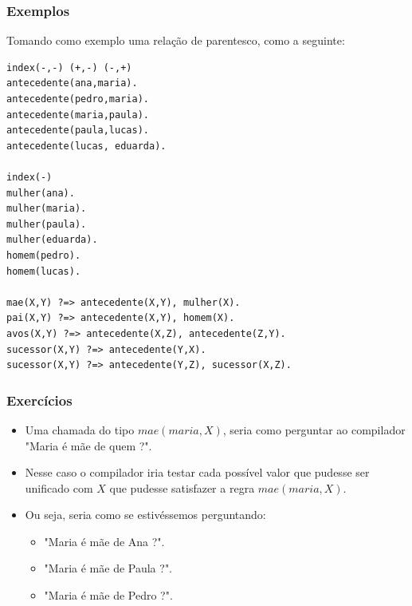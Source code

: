
\begin{frame}[fragile]

\frametitle{Exemplos}
    
Tomando como exemplo uma relação de parentesco, como a seguinte:
        \begin{lstlisting}[frame=single]
index(-,-) (+,-) (-,+)
antecedente(ana,maria).
antecedente(pedro,maria).
antecedente(maria,paula).
antecedente(paula,lucas).
antecedente(lucas, eduarda).

index(-)
mulher(ana).
mulher(maria).
mulher(paula).
mulher(eduarda).
homem(pedro).
homem(lucas).

mae(X,Y) ?=> antecedente(X,Y), mulher(X).
pai(X,Y) ?=> antecedente(X,Y), homem(X).
avos(X,Y) ?=> antecedente(X,Z), antecedente(Z,Y).
sucessor(X,Y) ?=> antecedente(Y,X).
sucessor(X,Y) ?=> antecedente(Y,Z), sucessor(X,Z).
        \end{lstlisting}
    
\end{frame}




\begin{frame}[fragile]
\frametitle{Exercícios}
    
    \begin{itemize}
        \item Uma chamada do tipo $mae(maria, X)$, seria como perguntar ao compilador
        "Maria é mãe de quem ?".
        
        \item Nesse caso o compilador iria testar cada possível valor que pudesse ser 
        unificado com $X$ que pudesse satisfazer a regra $mae(maria,X)$.
        
        \item Ou seja, seria como se estivéssemos perguntando:
        
        \begin{itemize}
            \item "Maria é mãe de Ana ?".
            
            \item "Maria é mãe de Paula ?".
            
            \item "Maria é mãe de Pedro ?".
            
    
        \end{itemize}
        
    \end{itemize}
    
\end{frame}




